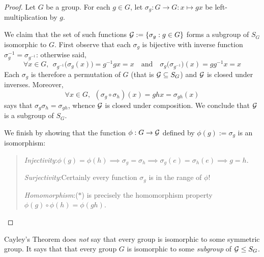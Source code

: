\begin{proof}
	Let $G$ be a group. For each $g\in G$, let $\sigma_g:G\to G:x\mapsto gx$ be left-multiplication by $g$.\par
	We claim that the set of such functions $\mathcal{G}:=\{\sigma_g:g\in G\}$ forms a subgroup of $S_G$ isomorphic to $G$.\smallbreak
	First observe that each $\sigma_g$ is bijective with inverse function $\sigma_g^{-1}=\sigma_{g^{-1}}$: otherwise said,
	\[
		\forall x\in G,\ \ \sigma_{g^{-1}}\bigl(\sigma_g(x)\bigr) =g^{-1}gx=x
		\quad\text{and}\quad 
		\sigma_g\bigl(\sigma_{g^{-1}}\bigr)(x)=gg^{-1}x=x
	\]
	Each $\sigma_g$ is therefore a permutation of $G$ (that is $\mathcal{G}\subseteq S_G$) and $\mathcal{G}$ is closed under inverses. Moreover,
	\[
		\forall x\in G,\ \ (\sigma_g\circ \sigma_h)(x)= ghx =\sigma_{gh}(x) \tag{$\ast$}
	\]
	says that $\sigma_g\sigma_h=\sigma_{gh}$, whence $\mathcal{G}$ is closed under composition. We conclude that $\mathcal{G}$ is a subgroup of $S_G$.\smallbreak
	
	We finish by showing that the function $\phi:G\to \mathcal{G}$ defined by $\phi(g):=\sigma_g$ is an isomorphism:
	\begin{quote}
		\emph{Injectivity}:\quad $\phi(g)=\phi(h)\implies \sigma_g=\sigma_h\implies \sigma_g(e)=\sigma_h(e) \implies g=h$.\par
		\emph{Surjectivity}:\quad Certainly every function $\sigma_g$ is in the range of $\phi$!\par
		\emph{Homomorphism}:\quad ($\ast$) is precisely the homomorphism property $\phi(g)\circ\phi(h)=\phi(gh)$.
		\vspace{-20pt}
	\end{quote}
\end{proof}

Cayley's Theorem does \emph{not} say that every group is isomorphic to some symmetric group. It says that that every group $G$ is isomorphic to some \emph{subgroup} of $\mathcal{G}\le S_G$.


   

